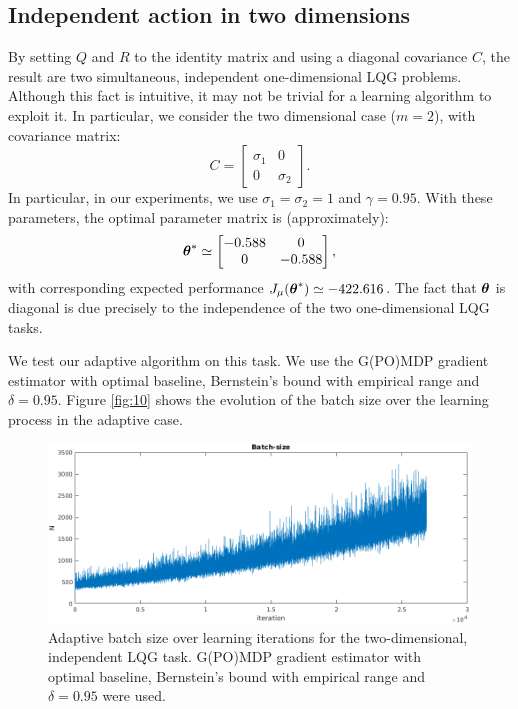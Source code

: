 \subsection{Independent action in two dimensions}
By setting $Q$ and $R$ to the identity matrix and using a diagonal covariance $C$, the result are two simultaneous, independent one-dimensional \ac{LQG} problems. Although this fact is intuitive, it may not be trivial for a learning algorithm to exploit it. In particular, we consider the two dimensional case ($m=2$), with covariance matrix:
\[
	C = 
	\begin{bmatrix}
	\sigma_1 & 0 		\\
	0		 & \sigma_2
	\end{bmatrix}.
\]
In particular, in our experiments, we use $\sigma_1 = \sigma_2 = 1$ and $\gamma = 0.95$. With these parameters, the optimal parameter matrix is (approximately):
\[
	\boldsymbol{\theta}^* \simeq 
	\begin{bmatrix}
	-0.588 & 0 		\\
	0		 & -0.588
	\end{bmatrix},
\]
with corresponding expected performance $J_\mu(\boldsymbol{\theta}^*) \simeq -422.616$. The fact that $\boldsymbol{\theta}$ is diagonal is due precisely to the independence of the two one-dimensional \ac{LQG} tasks.

We test our adaptive algorithm on this task. We use the G(PO)MDP gradient estimator with optimal baseline, Bernstein's bound with empirical range and $\delta=0.95$.
Figure \ref{fig:10} shows the evolution of the batch size over the learning process in the adaptive case.

\begin{figure}[h!]\label{fig:10}
\includegraphics[width = 1.4\textwidth,left]{Images/lqg2d_batchsize.png}
\caption{Adaptive batch size over learning iterations for the two-dimensional, independent \ac{LQG} task. G(PO)MDP gradient estimator with optimal baseline, Bernstein's bound with empirical range and $\delta=0.95$ were used.}
\label{fig:9}
\end{figure}

